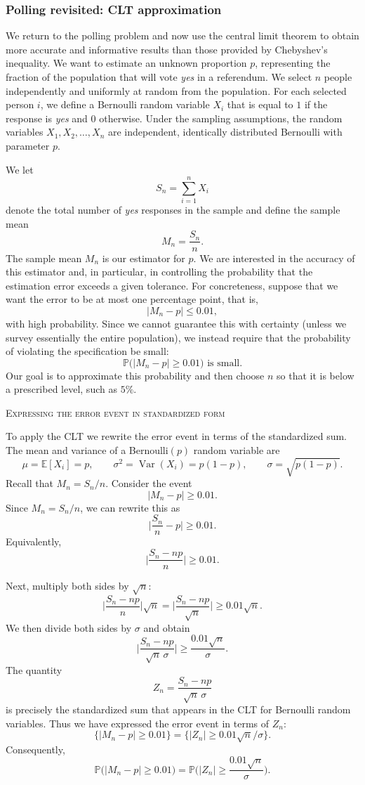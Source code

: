 \subsubsection{Polling revisited: CLT approximation}

We return to the polling problem and now use the central limit theorem to obtain more accurate and informative results than those provided by Chebyshev's inequality.  
We want to estimate an unknown proportion \(p\), representing the fraction of the population that will vote \textit{yes} in a referendum.  
We select \(n\) people independently and uniformly at random from the population.  
For each selected person \(i\), we define a Bernoulli random variable \(X_i\) that is equal to \(1\) if the response is \textit{yes} and \(0\) otherwise.  
Under the sampling assumptions, the random variables \(X_1, X_2, \ldots, X_n\) are independent, identically distributed Bernoulli with parameter \(p\).

We let
\[
S_n = \sum_{i=1}^{n} X_i
\]
denote the total number of \textit{yes} responses in the sample and define the sample mean
\[
M_n = \frac{S_n}{n}.
\]
The sample mean \(M_n\) is our estimator for \(p\).  
We are interested in the accuracy of this estimator and, in particular, in controlling the probability that the estimation error exceeds a given tolerance.  
For concreteness, suppose that we want the error to be at most one percentage point, that is,
\[
|M_n - p| \leq 0.01,
\]
with high probability.  
Since we cannot guarantee this with certainty (unless we survey essentially the entire population), we instead require that the probability of violating the specification be small:
\[
\mathbb{P}\big(|M_n - p| \geq 0.01\big)
\text{ is small.}
\]
Our goal is to approximate this probability and then choose \(n\) so that it is below a prescribed level, such as \(5\%\).

\bigskip
\textsc{Expressing the error event in standardized form}

To apply the CLT we rewrite the error event in terms of the standardized sum.  
The mean and variance of a Bernoulli\((p)\) random variable are
\[
\mu = \mathbb{E}[X_i] = p,
\qquad
\sigma^2 = \operatorname{Var}(X_i) = p(1-p),
\qquad
\sigma = \sqrt{p(1-p)}.
\]
Recall that \(M_n = S_n/n\).  
Consider the event
\[
|M_n - p| \geq 0.01.
\]
Since \(M_n = S_n/n\), we can rewrite this as
\[
\Big|\frac{S_n}{n} - p\Big|
\geq 0.01.
\]
Equivalently,
\[
\Big|\frac{S_n - np}{n}\Big|
\geq 0.01.
\]

Next, multiply both sides by \(\sqrt{n}\):
\[
\Big|\frac{S_n - np}{n}\Big| \sqrt{n}
=
\Big|\frac{S_n - np}{\sqrt{n}}\Big|
\geq 0.01 \sqrt{n}.
\]
We then divide both sides by \(\sigma\) and obtain
\[
\Big|\frac{S_n - np}{\sqrt{n}\,\sigma}\Big|
\geq \frac{0.01\sqrt{n}}{\sigma}.
\]
The quantity
\[
Z_n
=
\frac{S_n - np}{\sqrt{n}\,\sigma}
\]
is precisely the standardized sum that appears in the CLT for Bernoulli random variables.  
Thus we have expressed the error event in terms of \(Z_n\):
\[
\big\{|M_n - p| \geq 0.01\big\}
=
\big\{|Z_n| \geq 0.01\sqrt{n}/\sigma\big\}.
\]
Consequently,
\[
\mathbb{P}\big(|M_n - p| \geq 0.01\big)
=
\mathbb{P}\Big(|Z_n| \geq \frac{0.01\sqrt{n}}{\sigma}\Big).
\]

